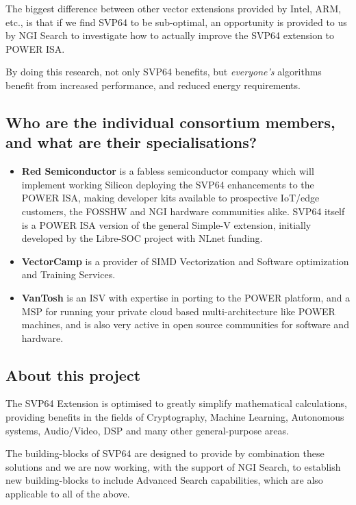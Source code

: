 The biggest difference between other vector extensions provided by Intel,
ARM, etc., is that if we find \acrshort{SVP64} to be sub-optimal, an opportunity is
provided to us by \acrshort{NGI} Search to investigate how to actually improve the
\acrshort{SVP64} extension to \acrshort{POWER} ISA.

By doing this research, not only \acrshort{SVP64} benefits, but \textit{everyone's} algorithms
benefit from increased performance, and reduced energy requirements.

\subsection{Who are the individual consortium members, and what are their specialisations?}

\begin{itemize}
  \item \textbf{Red Semiconductor} is a fabless semiconductor company which will implement
  working Silicon deploying the \acrshort{SVP64} enhancements to the \acrshort{POWER} ISA, making
  developer kits available to prospective \acrfull{IoT}/edge customers, the
  \acrfull{FOSSHW} and NGI hardware communities
  alike. \acrshort{SVP64} itself is a \acrshort{POWER} ISA version of the general Simple-V
  extension, initially developed by the Libre-SOC project with NLnet funding.
  \item \textbf{VectorCamp} is a provider of \acrfull{SIMD} Vectorization and Software optimization
  and Training Services.
  \item \textbf{VanTosh} is an \acrfull{ISV} with expertise in porting
  to the \acrshort{POWER} platform, and a \acrfull{MSP} for running
  your private cloud based multi-architecture like \acrshort{POWER} machines, and is
  also very active in open source communities for software and hardware.
\end{itemize}

\subsection{About this project}

The \acrshort{SVP64} Extension is optimised to greatly simplify mathematical calculations,
providing benefits in the fields of Cryptography, Machine Learning,
Autonomous systems, Audio/Video, \acrfull{DSP} and many other general-purpose areas.
 
The building-blocks of \acrshort{SVP64} are designed to provide by combination these
solutions and we are now working, with the support of \acrshort{NGI} Search, to
establish new building-blocks to include Advanced Search capabilities,
which are also applicable to all of the above.

